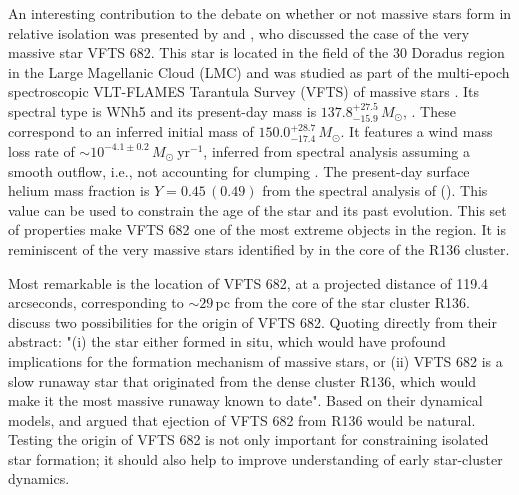 \documentclass[apjl,twocolumn]{emulateapj}
\begin{document}
An interesting contribution to the debate on whether or not massive
stars form in relative isolation was presented by
\cite{bestenlehner:11} and \cite{bressert:12}, who discussed the case of the very massive star
VFTS 682.  This star is located in the field of the 30 Doradus region
in the Large Magellanic Cloud (LMC) and was studied as part of the
multi-epoch spectroscopic VLT-FLAMES Tarantula Survey (VFTS) of
massive stars \citep{evans:11}. Its spectral type is WNh5 and its 
present-day mass is $137.8^{+27.5}_{-15.9}\,M_\odot$,
\citep{schneider:18}. These correspond to an inferred initial mass of
$150.0^{+28.7}_{-17.4}\,M_\odot$. It features a wind mass loss rate of
$\sim10^{-4.1\pm0.2}\,M_\odot \ \mathrm{yr}^{-1}$, inferred from
spectral analysis assuming a smooth outflow, i.e., not accounting for clumping
\citep[][]{bestenlehner:11}. The present-day surface helium mass
fraction is $Y=0.45\, (0.49)$ from the spectral analysis of
\cite{bestenlehner:11} (\citealt{rubio-diez:17}). This value can be
used to constrain the age of the star and its past evolution. This set
of properties make VFTS 682 one of the
most extreme objects in the region. It is reminiscent of the very
massive stars %
identified by
\citet{dekoter:97,crowther:10, crowther:16} in the core of the
R136 cluster. 

Most remarkable is the location of VFTS 682, at a projected distance of
119.4 arcseconds, corresponding to $\sim$$29$\,pc from the core of the star cluster
R136. \citet{bestenlehner:11} discuss two possibilities for the
origin of VFTS 682. Quoting directly from their abstract: "(i) the
star either formed in situ, which would have profound implications for
the formation mechanism of massive stars, or (ii) VFTS 682 is a slow
runaway star that originated from the dense cluster R136, which would
make it the most massive runaway known to date". Based on their
dynamical models, \citet{fujii:11} and \citet{banerjee:12} argued that
ejection of VFTS 682 from R136 would be natural. Testing the origin of
VFTS 682 is not only important for constraining isolated star
formation; it should also help to improve understanding of early star-cluster dynamics.

\end{document}
